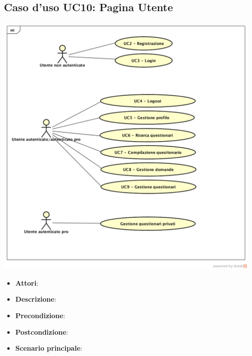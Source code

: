\subsection{Caso d'uso UC10: Pagina Utente}
\begin{center}
\includegraphics[scale=0.5]{UML/UC1.png}
\end{center}
\begin{itemize}
\item\textbf{Attori}: 
\item\textbf{Descrizione}: 
\item\textbf{Precondizione}: 
\item\textbf{Postcondizione}:
\item\textbf{Scenario principale}:
\end{itemize}
